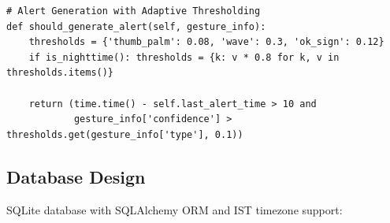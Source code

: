 \documentclass[12pt,a4paper]{article}
\begin{document}
\begin{lstlisting}
# Alert Generation with Adaptive Thresholding
def should_generate_alert(self, gesture_info):
    thresholds = {'thumb_palm': 0.08, 'wave': 0.3, 'ok_sign': 0.12}
    if is_nighttime(): thresholds = {k: v * 0.8 for k, v in thresholds.items()}
    
    return (time.time() - self.last_alert_time > 10 and 
            gesture_info['confidence'] > thresholds.get(gesture_info['type'], 0.1))
\end{lstlisting}

\subsection{Database Design}
SQLite database with SQLAlchemy ORM and IST timezone support:
\end{document}
